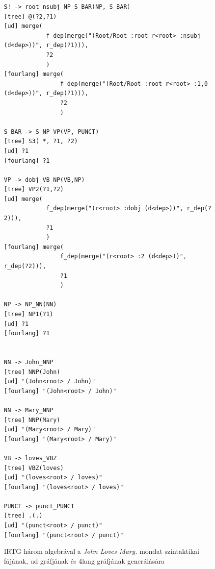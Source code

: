 \begin{figure}[h]
\begin{verbatim}
S! -> root_nsubj_NP_S_BAR(NP, S_BAR)
[tree] @(?2,?1)
[ud] merge(
			f_dep(merge("(Root/Root :root r<root> :nsubj (d<dep>))", r_dep(?1))),
			?2
			)
[fourlang] merge(
				f_dep(merge("(Root/Root :root r<root> :1,0 (d<dep>))", r_dep(?1))),
				?2
				)

S_BAR -> S_NP_VP(VP, PUNCT)
[tree] S3( *, ?1, ?2)
[ud] ?1
[fourlang] ?1

VP -> dobj_VB_NP(VB,NP)
[tree] VP2(?1,?2)
[ud] merge(
			f_dep(merge("(r<root> :dobj (d<dep>))", r_dep(?2))),
			?1
			)
[fourlang] merge(
				f_dep(merge("(r<root> :2 (d<dep>))", r_dep(?2))),
				?1
				)

NP -> NP_NN(NN)
[tree] NP1(?1)
[ud] ?1
[fourlang] ?1


NN -> John_NNP
[tree] NNP(John)
[ud] "(John<root> / John)"
[fourlang] "(John<root> / John)"

NN -> Mary_NNP
[tree] NNP(Mary)
[ud] "(Mary<root> / Mary)"
[fourlang] "(Mary<root> / Mary)"

VB -> loves_VBZ
[tree] VBZ(loves)
[ud] "(loves<root> / loves)"
[fourlang] "(loves<root> / loves)"

PUNCT -> punct_PUNCT
[tree] .(.)
[ud] "(punct<root> / punct)"
[fourlang] "(punct<root> / punct)"
\end{verbatim}
\caption{IRTG három algebrával a \textit{John Loves Mary.} mondat szintaktikai fájának, ud gráfjának és 4lang gráfjának generálására}
\label{cod:example6}
\end{figure}

